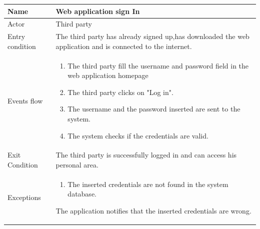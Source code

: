 \begin{tabular}{|l|p{11cm}|}
    \hline
    Name & Web application sign In
    \\ \hline
    Actor & Third party
    \\ \hline 
    Entry condition & The third party has already signed up,has downloaded the web application and is connected to the internet.
    \\ \hline
    Events flow &
    \begin{enumerate}
    \item The third party fill the username and password field in the web application homepage
    \item The third party clicks on "Log in".
    \item The username and the password inserted are sent to the system.
    \item The system checks if the credentials are valid.
    \end{enumerate}
     \\ \hline
     Exit Condition & The third party is successfully logged in and can access his personal area.
     \\
    \hline
    Exceptions &
     \begin{enumerate}
    \item The inserted credentials are not found in the system database.  
    \end{enumerate}
   The application notifies that the inserted credentials are wrong.
      \\
    \hline
\end{tabular}

\givespace

